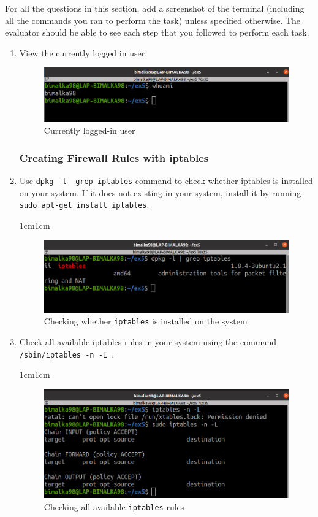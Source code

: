 \documentclass[11pt,letterpaper]{article}
\newenvironment{answer}{\em \color{blue} \begin{adjustwidth}{1cm}{1cm}}{\end{adjustwidth}}
\begin{document}
	For all the questions in this section, add a screenshot of the terminal (including all the commands you ran to perform the task) unless specified otherwise. The evaluator should be able to see each step that you followed to perform each task.
	\begin{enumerate}
		
		\item View the currently logged in user.
		
		\begin{figure}[H]
			\centering
			\includegraphics[width=0.65\columnwidth]{images/part1/1.png}
			\caption{Currently logged-in user} \label{fig:1}
		\end{figure}
		
		\subsubsection*{Creating Firewall Rules with iptables}
		
		\item Use \texttt{dpkg -l \textbar \ grep iptables} command to check whether iptables is installed on your system. If it does not existing in your system, install it by running \texttt{sudo apt-get install iptables}.
		
		\begin{answer}
			\begin{figure}[H]
				\centering
				\includegraphics[width=0.65\columnwidth]{images/part1/2.png}
				\caption{Checking whether {\tt iptables} is installed on the system}
			\end{figure}
		\end{answer}
		
		\item Check all available iptables rules in your system using the command \texttt{/sbin/iptables -n -L }.
		
		\begin{answer}
			\begin{figure}[H]
				\centering
				\includegraphics[width=0.65\columnwidth]{images/part1/3.png}
				\caption{Checking all available {\tt iptables} rules}
			\end{figure}
		\end{answer}
		

\end{enumerate}
\end{document}
